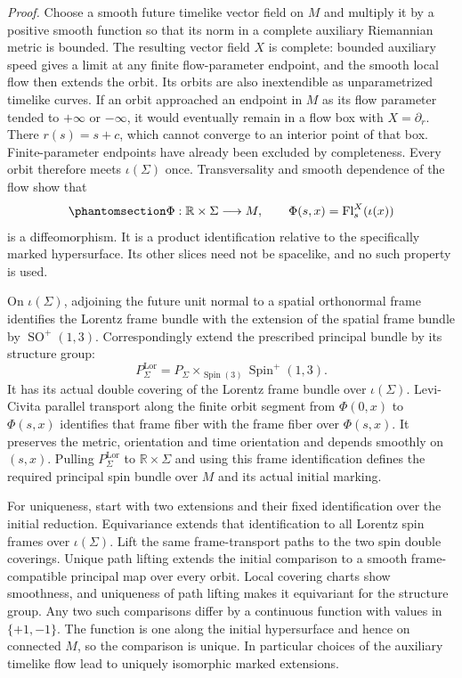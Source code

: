 \documentclass[
  english,
  11pt,
  reqno]{amsart}
\begin{document}
\emph{Proof.} Choose a smooth future timelike vector field on \(M\) and
multiply it by a positive smooth function so that its norm in a complete
auxiliary Riemannian metric is bounded. The resulting vector field \(X\)
is complete: bounded auxiliary speed gives a limit at any finite
flow-parameter endpoint, and the smooth local flow then extends the
orbit. Its orbits are also inextendible as unparametrized timelike
curves. If an orbit approached an endpoint in \(M\) as its flow
parameter tended to \(+\infty\) or \(-\infty\), it would eventually
remain in a flow box with \(X=\partial_r\). There \(r(s)=s+c\), which
cannot converge to an interior point of that box. Finite-parameter
endpoints have already been excluded by completeness. Every orbit
therefore meets \(\iota(\Sigma)\) once. Transversality and smooth
dependence of the flow show that
\begin{equation}\protect\phantomsection\label{eq:global-marked-cauchy-flow}{
\Phi:\mathbb R\times\Sigma\longrightarrow M,
\qquad
\Phi(s,x)=\operatorname{Fl}^X_s(\iota(x))
}\end{equation} is a diffeomorphism. It is a product identification
relative to the specifically marked hypersurface. Its other slices need
not be spacelike, and no such property is used.

On \(\iota(\Sigma)\), adjoining the future unit normal to a spatial
orthonormal frame identifies the Lorentz frame bundle with the extension
of the spatial frame bundle by \(\operatorname{SO}^+(1,3)\).
Correspondingly extend the prescribed principal bundle by its structure
group: \[
P^{\mathrm{Lor}}_\Sigma
=P_\Sigma\times_{\operatorname{Spin}(3)}
\operatorname{Spin}^+(1,3).
\] It has its actual double covering of the Lorentz frame bundle over
\(\iota(\Sigma)\). Levi-Civita parallel transport along the finite orbit
segment from \(\Phi(0,x)\) to \(\Phi(s,x)\) identifies that frame fiber
with the frame fiber over \(\Phi(s,x)\). It preserves the metric,
orientation and time orientation and depends smoothly on \((s,x)\).
Pulling \(P^{\mathrm{Lor}}_\Sigma\) to \(\mathbb R\times\Sigma\) and
using this frame identification defines the required principal spin
bundle over \(M\) and its actual initial marking.

For uniqueness, start with two extensions and their fixed identification
over the initial reduction. Equivariance extends that identification to
all Lorentz spin frames over \(\iota(\Sigma)\). Lift the same
frame-transport paths to the two spin double coverings. Unique path
lifting extends the initial comparison to a smooth frame-compatible
principal map over every orbit. Local covering charts show smoothness,
and uniqueness of path lifting makes it equivariant for the structure
group. Any two such comparisons differ by a continuous function with
values in \(\{+1,-1\}\). The function is one along the initial
hypersurface and hence on connected \(M\), so the comparison is unique.
In particular choices of the auxiliary timelike flow lead to uniquely
isomorphic marked extensions.
\end{document}
